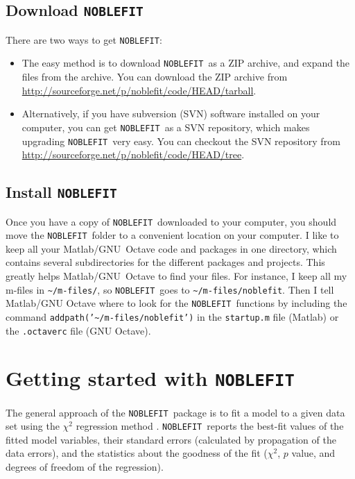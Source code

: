 \documentclass[12pt]{article}
\newcommand{\noblefit}{{\tt NOBLEFIT}}
\newcommand{\secref}[1]{Sec.~\ref{sec:#1}}
\begin{document}
\subsection{Download \noblefit}\label{sec:get_mpic}
There are two ways to get \noblefit: 
\begin{itemize}
	\item The easy method is to download \noblefit\ as a ZIP archive, and expand the files from the archive. You can download the ZIP archive from \url{http://sourceforge.net/p/noblefit/code/HEAD/tarball}.
	\item Alternatively, if you have subversion (SVN) software installed on your computer, you can get \noblefit\ as a SVN repository, which makes upgrading \noblefit\ very easy. You can checkout the SVN repository from \url{http://sourceforge.net/p/noblefit/code/HEAD/tree}.
\end{itemize}

\subsection{Install \noblefit}\label{sec:install_mpic}
Once you have a copy of \noblefit\ downloaded to your computer, you should move the \noblefit\ folder to a convenient location on your computer. I like to keep all your Matlab/\mbox{GNU Octave} code and packages in one directory, which contains several subdirectories for the different packages and projects. This greatly helps Matlab/\mbox{GNU Octave} to find your files. For instance, I keep all my m-files in {\tt \textasciitilde{}/m-files/}, so \noblefit\ goes to {\tt \textasciitilde{}/m-files/noblefit}. Then I tell Matlab/GNU Octave where to look for the \noblefit\ functions by including the command {\tt addpath('\textasciitilde{}/m-files/noblefit')} in the {\tt startup.m} file (Matlab) or the {\tt .octaverc} file (GNU Octave).

\section{Getting started with \noblefit}

The general approach of the \noblefit\ package is to fit a model to a given data set using the $\chi^2$ regression method \citep{Press:1986}. \noblefit\ reports the best-fit values of the fitted model variables, their standard errors (calculated by propagation of the data errors), and the statistics about the goodness of the fit ($\chi^2$, $p$ value, and degrees of freedom of the regression).\par
\end{document}
